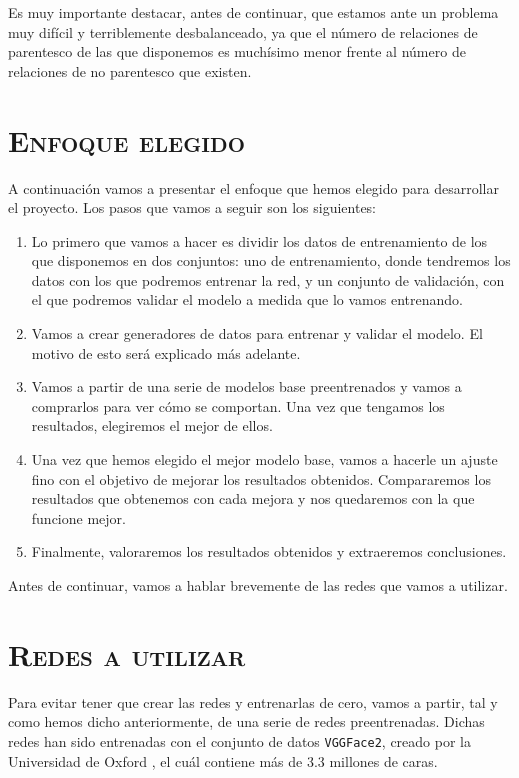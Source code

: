 \documentclass[11pt,a4paper]{article}
\begin{document}
Es muy importante destacar, antes de continuar, que estamos ante un problema muy difícil y terriblemente
desbalanceado, ya que el número de relaciones de parentesco de las que disponemos es muchísimo menor frente
al número de relaciones de no parentesco que existen.

\section{\textsc{Enfoque elegido}}

A continuación vamos a presentar el enfoque que hemos elegido para desarrollar el proyecto. Los pasos
que vamos a seguir son los siguientes:

\begin{enumerate}
    \item Lo primero que vamos a hacer es dividir los datos de entrenamiento de los que disponemos
    en dos conjuntos: uno de entrenamiento, donde tendremos los datos con los que podremos entrenar
    la red, y un conjunto de validación, con el que podremos validar el modelo a medida que lo vamos entrenando.
    \item Vamos a crear generadores de datos para entrenar y validar el modelo. El motivo de esto será explicado
    más adelante.
    \item Vamos a partir de una serie de modelos base preentrenados y vamos a comprarlos para ver cómo se comportan.
    Una vez que tengamos los resultados, elegiremos el mejor de ellos.
    \item Una vez que hemos elegido el mejor modelo base, vamos a hacerle un ajuste fino con el objetivo
    de mejorar los resultados obtenidos. Compararemos los resultados que obtenemos con cada mejora y nos quedaremos
    con la que funcione mejor.
    \item Finalmente, valoraremos los resultados obtenidos y extraeremos conclusiones.
\end{enumerate}

Antes de continuar, vamos a hablar brevemente de las redes que vamos a utilizar.

\section{\textsc{Redes a utilizar}}

Para evitar tener que crear las redes y entrenarlas de cero, vamos a partir, tal y como hemos dicho anteriormente,
de una serie de redes preentrenadas. Dichas redes han sido entrenadas con el conjunto de datos \texttt{VGGFace2},
creado por la Universidad de Oxford \cite{vggface2}, el cuál contiene más de 3.3 millones de caras.
\end{document}
